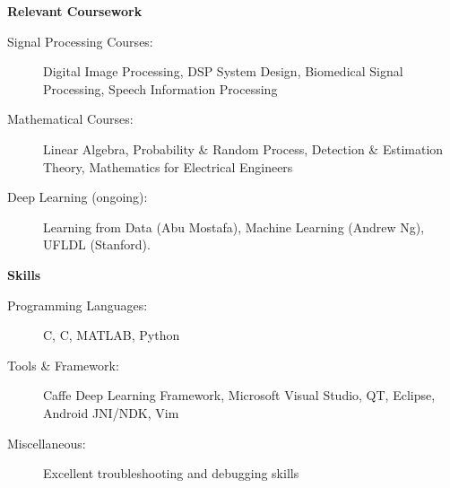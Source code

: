 \documentclass[letterpaper,11pt]{article}
\def\CC{{C\nolinebreak[4]\hspace{-.05em}\raisebox{.4ex}{\tiny\bf ++}}}
\newcommand{\resheading}[1]{{\large \colorbox{mygrey}{\begin{minipage}{\textwidth}{\textbf{#1 \vphantom{p\^{E}}}}\end{minipage}}}}
\begin{document}
\resheading{Relevant Coursework}
\begin{description}
	\item[Signal Processing Courses:]
		Digital Image Processing, DSP System Design, Biomedical Signal Processing, Speech Information Processing
	\item[Mathematical Courses:]
		Linear Algebra, Probability \& Random Process, Detection \& Estimation Theory, Mathematics for Electrical Engineers
	\item[Deep Learning (ongoing):]
		Learning from Data (Abu Mostafa), Machine Learning (Andrew Ng), UFLDL (Stanford).
\end{description}

\resheading{Skills}
\begin{description}
	\item[Programming Languages:]
		C, \CC, MATLAB, Python
	\item[Tools \& Framework:]
		Caffe Deep Learning Framework, Microsoft Visual Studio, QT, Eclipse, Android JNI/NDK, Vim
	\item[Miscellaneous:]
		Excellent troubleshooting and debugging skills
\end{description}
\end{document}

